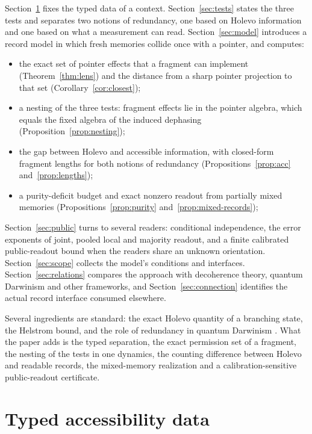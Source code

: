 \documentclass[12pt,a4paper]{article}
\begin{document}
Section~\ref{sec:background} fixes the typed data of a context. Section~\ref{sec:tests} states the three tests and separates two notions of redundancy, one based on Holevo information and one based on what a measurement can read. Section~\ref{sec:model} introduces a record model in which fresh memories collide once with a pointer, and computes:
\begin{itemize}
\item the exact set of pointer effects that a fragment can implement (Theorem~\ref{thm:lens}) and the distance from a sharp pointer projection to that set (Corollary~\ref{cor:closest});
\item a nesting of the three tests: fragment effects lie in the pointer algebra, which equals the fixed algebra of the induced dephasing (Proposition~\ref{prop:nesting});
\item the gap between Holevo and accessible information, with closed-form fragment lengths for both notions of redundancy (Propositions~\ref{prop:acc} and~\ref{prop:lengths});
\item a purity-deficit budget and exact nonzero readout from partially mixed memories (Propositions~\ref{prop:purity} and~\ref{prop:mixed-records});
\end{itemize}
Section~\ref{sec:public} turns to several readers: conditional independence, the error exponents of joint, pooled local and majority readout, and a finite calibrated public-readout bound when the readers share an unknown orientation. Section~\ref{sec:scope} collects the model's conditions and interfaces. Section~\ref{sec:relations} compares the approach with decoherence theory, quantum Darwinism and other frameworks, and Section~\ref{sec:connection} identifies the actual record interface consumed elsewhere.

Several ingredients are standard: the exact Holevo quantity of a branching state, the Helstrom bound, and the role of redundancy in quantum Darwinism \cite{Zurek2003,Zurek2009,ZwolakRiedelZurek2016}. What the paper adds is the typed separation, the exact permission set of a fragment, the nesting of the tests in one dynamics, the counting difference between Holevo and readable records, the mixed-memory realization and a calibration-sensitive public-readout certificate.

\section{Typed accessibility data}
\label{sec:background}
\end{document}
